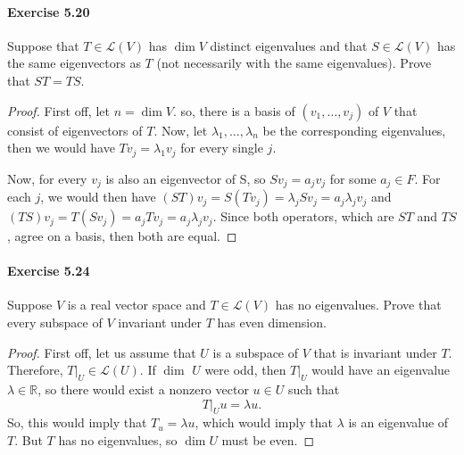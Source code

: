 \documentclass{article}
\theoremstyle{definition}
\begin{document}
\paragraph{Exercise 5.20} Suppose that $T \in \mathcal{L}(V)$ has $\operatorname{dim} V$ distinct eigenvalues and that $S \in \mathcal{L}(V)$ has the same eigenvectors as $T$ (not necessarily with the same eigenvalues). Prove that $S T=T S$.
\begin{proof}
    First off, let $n=\operatorname{dim} V$. so, there is a basis of $\left(v_1, \ldots, v_j\right)$ of $V$ that consist of eigenvectors of $T$. Now, let $\lambda_1, \ldots, \lambda_n$ be the corresponding eigenvalues, then we would have $T v_j=\lambda_1 v_j$ for every single $j$.

Now, for every $v_j$ is also an eigenvector of S, so $S v_j=a_j v_j$ for some $a_j \in F$. For each $j$, we would then have $(S T) v_j=S\left(T v_j\right)=\lambda_j S v_j=a_j \lambda_j v_j$ and $(T S) v_j=T\left(S v_j\right)=a_j T v_j=a_j \lambda_j v_j$. Since both operators, which are $S T$ and $T S$, agree on a basis, then both are equal.
\end{proof}



\paragraph{Exercise 5.24} Suppose $V$ is a real vector space and $T \in \mathcal{L}(V)$ has no eigenvalues. Prove that every subspace of $V$ invariant under $T$ has even dimension.
\begin{proof}
    First off, let us assume that $U$ is a subspace of $V$ that is invariant under $T$. Therefore, $\left.T\right|_U \in \mathcal{L}(U)$. If $\operatorname{dim}$ $U$ were odd, then $\left.T\right|_U$ would have an eigenvalue $\lambda \in \mathbb{R}$, so there would exist a nonzero vector $u \in U$ such that
$$
\left.T\right|_U u=\lambda u .
$$
So, this would imply that $T_u=\lambda u$, which would imply that $\lambda$ is an eigenvalue of $T$. But $T$ has no eigenvalues, so $\operatorname{dim} U$ must be even.
\end{proof}
\end{document}

